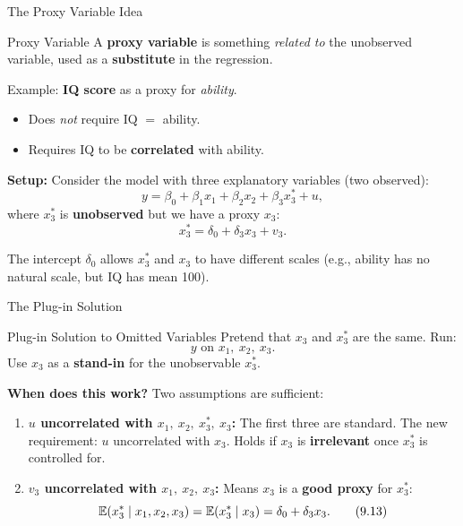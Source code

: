 \documentclass[aspectratio=169, 12pt]{beamer}
\begin{document}
\begin{frame}[shrink=20]{The Proxy Variable Idea}

  \begin{definitionbox}{Proxy Variable}
    A \textbf{proxy variable} is something \emph{related to} the unobserved variable, used
    as a \textbf{substitute} in the regression.

    \smallskip
    Example: \textbf{IQ score} as a proxy for \emph{ability}.
    \begin{itemize}\setlength{\itemsep}{1pt}
      \item Does \emph{not} require IQ $=$ ability.
      \item Requires IQ to be \textbf{correlated} with ability.
    \end{itemize}
  \end{definitionbox}

  \textbf{Setup:} Consider the model with three explanatory variables (two observed):
  \[
    y = \beta_0 + \beta_1 x_1 + \beta_2 x_2 + \beta_3 x_3^* + u, \tag{9.10}
  \]
  where $x_3^*$ is \textbf{unobserved} but we have a proxy $x_3$:
  \[
    x_3^* = \delta_0 + \delta_3 x_3 + v_3. \tag{9.11}
  \]

  \begin{keybox}
    The intercept $\delta_0$ allows $x_3^*$ and $x_3$ to have different scales (e.g., ability
    has no natural scale, but IQ has mean 100).
  \end{keybox}

\end{frame}

\begin{frame}[shrink=15]{The Plug-in Solution}

  \begin{definitionbox}{Plug-in Solution to Omitted Variables}
    Pretend that $x_3$ and $x_3^*$ are the same. Run:
    \[
      y \text{ on } x_1,\ x_2,\ x_3. \tag{9.12}
    \]
    Use $x_3$ as a \textbf{stand-in} for the unobservable $x_3^*$.
  \end{definitionbox}

  \textbf{When does this work?} Two assumptions are sufficient:

  \begin{assumptionbox}
  \begin{enumerate}\setlength{\itemsep}{2pt}
    \item \textbf{$u$ uncorrelated with $x_1,\ x_2,\ x_3^*,\ x_3$:}
    The first three are standard. The new requirement: $u$ uncorrelated with $x_3$.
    Holds if $x_3$ is \textbf{irrelevant} once $x_3^*$ is controlled for.

    \item \textbf{$v_3$ uncorrelated with $x_1,\ x_2,\ x_3$:}
    Means $x_3$ is a \textbf{good proxy} for $x_3^*$:
    \[
      \operatorname{\mathbb{E}}(x_3^* \mid x_1, x_2, x_3) = \operatorname{\mathbb{E}}(x_3^* \mid x_3) = \delta_0 + \delta_3 x_3. \tag{9.13}
    \]
  \end{enumerate}
  \end{assumptionbox}

\end{frame}
\end{document}
